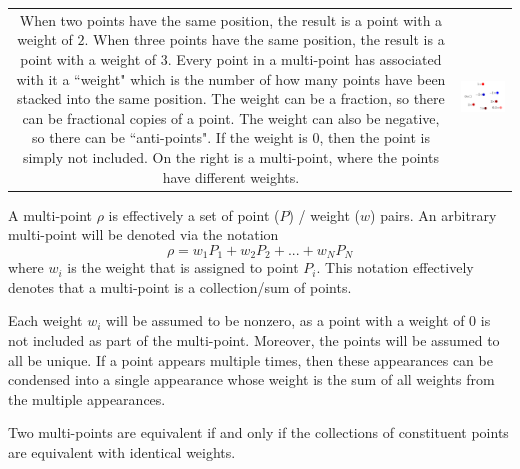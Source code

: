 \documentclass{book}
\begin{document}
\vspace{5mm}

\begin{tabular}{cc}
\parbox{0.5\textwidth}{
When two points have the same position, the result is a point with a weight of \(2\). When three points have the same position, the result is a point with a weight of \(3\). Every point in a multi-point has associated with it a ``weight" which is the number of how many points have been stacked into the same position. The weight can be a fraction, so there can be fractional copies of a point. The weight can also be negative, so there can be ``anti-points". If the weight is \(0\), then the point is simply not included. On the right is a multi-point, where the points have different weights.
} & \parbox{0.5\textwidth}{
\includegraphics[scale = 0.75]{Multi-structures/Multipoints/multi-point_multiplicity}
}
\end{tabular}

\vspace{2mm}

A multi-point \(\rho\) is effectively a set of point (\(P\)) / weight (\(w\)) pairs. An arbitrary multi-point will be denoted via the notation
\[\rho = w_1 P_1 + w_2 P_2 + ... + w_N P_N\]
where \(w_i\) is the weight that is assigned to point \(P_i\). This notation effectively denotes that a multi-point is a collection/sum of points.

Each weight \(w_i\) will be assumed to be nonzero, as a point with a weight of 0 is not included as part of the multi-point. Moreover, the points will be assumed to all be unique. If a point appears multiple times, then these appearances can be condensed into a single appearance whose weight is the sum of all weights from the multiple appearances. 

Two multi-points are equivalent if and only if the collections of constituent points are equivalent with identical weights. 
\end{document}
